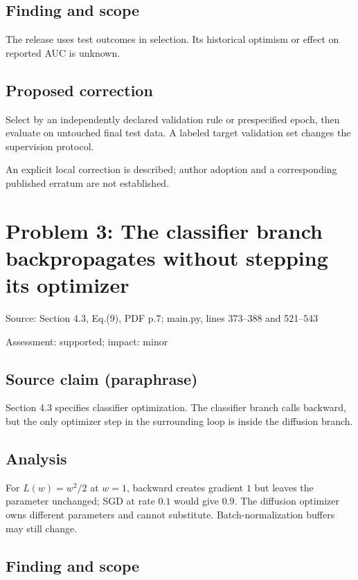 \documentclass[11pt]{article}
\begin{document}
\subsection*{Finding and scope}

The release uses test outcomes in selection. Its historical optimism or effect on reported AUC is unknown.

\subsection*{Proposed correction}

Select by an independently declared validation rule or prespecified epoch, then evaluate on untouched final test data. A labeled target validation set changes the supervision protocol.

An explicit local correction is described; author adoption and a corresponding published erratum are not established.

\section*{Problem 3: The classifier branch backpropagates without stepping its optimizer}

Source: Section 4.3, Eq.(9), PDF p.7; main.py, lines 373–388 and 521–543

Assessment: supported; impact: minor

\subsection*{Source claim (paraphrase)}

Section 4.3 specifies classifier optimization. The classifier branch calls backward, but the only optimizer step in the surrounding loop is inside the diffusion branch.

\subsection*{Analysis}

For \(L(w)=w^2/2\) at \(w=1\), backward creates gradient \(1\) but leaves the parameter unchanged; SGD at rate \(0.1\) would give \(0.9\). The diffusion optimizer owns different parameters and cannot substitute. Batch-normalization buffers may still change.

\subsection*{Finding and scope}
\end{document}
